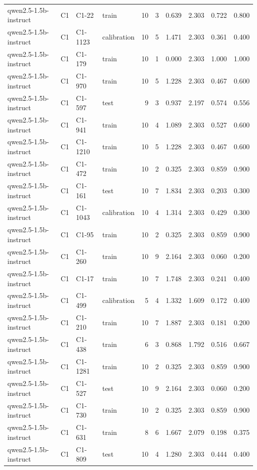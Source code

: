 \begin{table}
\begin{tabular}{llllrrrrrr}
qwen2.5-1.5b-instruct & C1 & C1-22 & train & 10 & 3 & 0.639 & 2.303 & 0.722 & 0.800 \\
qwen2.5-1.5b-instruct & C1 & C1-1123 & calibration & 10 & 5 & 1.471 & 2.303 & 0.361 & 0.400 \\
qwen2.5-1.5b-instruct & C1 & C1-179 & train & 10 & 1 & 0.000 & 2.303 & 1.000 & 1.000 \\
qwen2.5-1.5b-instruct & C1 & C1-970 & train & 10 & 5 & 1.228 & 2.303 & 0.467 & 0.600 \\
qwen2.5-1.5b-instruct & C1 & C1-597 & test & 9 & 3 & 0.937 & 2.197 & 0.574 & 0.556 \\
qwen2.5-1.5b-instruct & C1 & C1-941 & train & 10 & 4 & 1.089 & 2.303 & 0.527 & 0.600 \\
qwen2.5-1.5b-instruct & C1 & C1-1210 & train & 10 & 5 & 1.228 & 2.303 & 0.467 & 0.600 \\
qwen2.5-1.5b-instruct & C1 & C1-472 & train & 10 & 2 & 0.325 & 2.303 & 0.859 & 0.900 \\
qwen2.5-1.5b-instruct & C1 & C1-161 & test & 10 & 7 & 1.834 & 2.303 & 0.203 & 0.300 \\
qwen2.5-1.5b-instruct & C1 & C1-1043 & calibration & 10 & 4 & 1.314 & 2.303 & 0.429 & 0.300 \\
qwen2.5-1.5b-instruct & C1 & C1-95 & train & 10 & 2 & 0.325 & 2.303 & 0.859 & 0.900 \\
qwen2.5-1.5b-instruct & C1 & C1-260 & train & 10 & 9 & 2.164 & 2.303 & 0.060 & 0.200 \\
qwen2.5-1.5b-instruct & C1 & C1-17 & train & 10 & 7 & 1.748 & 2.303 & 0.241 & 0.400 \\
qwen2.5-1.5b-instruct & C1 & C1-499 & calibration & 5 & 4 & 1.332 & 1.609 & 0.172 & 0.400 \\
qwen2.5-1.5b-instruct & C1 & C1-210 & train & 10 & 7 & 1.887 & 2.303 & 0.181 & 0.200 \\
qwen2.5-1.5b-instruct & C1 & C1-438 & train & 6 & 3 & 0.868 & 1.792 & 0.516 & 0.667 \\
qwen2.5-1.5b-instruct & C1 & C1-1281 & train & 10 & 2 & 0.325 & 2.303 & 0.859 & 0.900 \\
qwen2.5-1.5b-instruct & C1 & C1-527 & test & 10 & 9 & 2.164 & 2.303 & 0.060 & 0.200 \\
qwen2.5-1.5b-instruct & C1 & C1-730 & train & 10 & 2 & 0.325 & 2.303 & 0.859 & 0.900 \\
qwen2.5-1.5b-instruct & C1 & C1-631 & train & 8 & 6 & 1.667 & 2.079 & 0.198 & 0.375 \\
qwen2.5-1.5b-instruct & C1 & C1-809 & test & 10 & 4 & 1.280 & 2.303 & 0.444 & 0.400 \\

\end{tabular}
\end{table}
